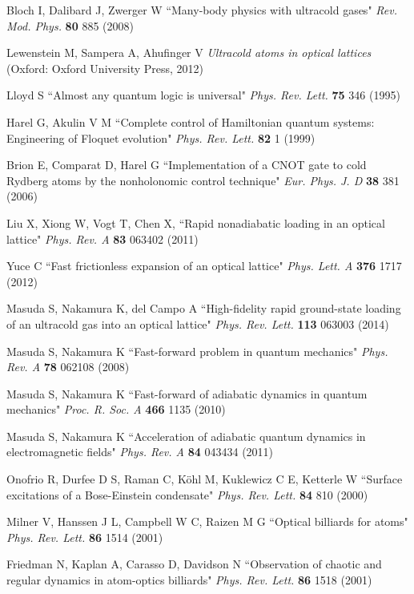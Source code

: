 \documentclass[pra,letterpaper,twocolumn,showpacs,superscriptaddress]{revtex4}
\begin{document}
\begin{thebibliography}{300}
 Bloch I, Dalibard J, Zwerger W ``Many-body physics with ultracold gases" {\it Rev. Mod. Phys.} \textbf{80} 885 (2008)

 Lewenstein M, Sampera A, Ahufinger V
{\it Ultracold atoms in optical lattices} (Oxford: Oxford University Press, 2012)

 Lloyd S ``Almost any quantum logic is universal" {\it Phys. Rev. Lett.} \textbf{75} 346 (1995)

 Harel G, Akulin V M 
``Complete control of Hamiltonian quantum systems: Engineering of Floquet evolution" {\it Phys. Rev. Lett.} \textbf{82} 1 (1999)

 Brion E, Comparat D, Harel G 
``Implementation of a CNOT gate to cold Rydberg atoms by the nonholonomic control technique" {\it Eur. Phys. J. D} \textbf{38} 381 (2006)

 Liu X, Xiong W, Vogt T, Chen X, ``Rapid nonadiabatic loading in an optical lattice"
{\it Phys. Rev. A} \textbf{83} 063402 (2011)

 Yuce C ``Fast frictionless expansion of an optical lattice" {\it Phys. Lett. A} \textbf{376} 1717 (2012)

 Masuda S, Nakamura K, del Campo A
``High-fidelity rapid ground-state loading of an ultracold gas into an optical lattice" {\it Phys. Rev. Lett.} \textbf{113} 063003 (2014)

 Masuda S, Nakamura K ``Fast-forward problem in quantum mechanics" {\it Phys. Rev. A} \textbf{78} 062108 (2008)

 Masuda S, Nakamura K ``Fast-forward of adiabatic dynamics in quantum mechanics" 
{\it Proc. R. Soc. A} \textbf{466} 1135 (2010)

 Masuda S, Nakamura K ``Acceleration of adiabatic quantum dynamics in electromagnetic fields"
{\it Phys. Rev. A} \textbf{84} 043434 (2011)

 Onofrio R, Durfee D S, Raman C, K\"ohl M, Kuklewicz C E, Ketterle W
``Surface excitations of a Bose-Einstein condensate" {\it Phys. Rev. Lett.} \textbf{84} 810 (2000)

 Milner V, Hanssen J L, Campbell W C, Raizen M G
``Optical billiards for atoms" {\it Phys. Rev. Lett.} \textbf{86} 1514 (2001)

 Friedman N, Kaplan A, Carasso D, Davidson N
``Observation of chaotic and regular dynamics in atom-optics billiards" {\it Phys. Rev. Lett.} \textbf{86} 1518 (2001)


\end{thebibliography}
\end{document}
